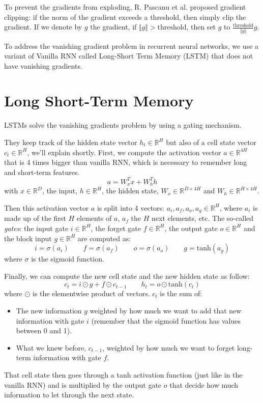 To prevent the gradients from exploding, R. Pascanu et al. \cite{difficulty-rnn} proposed gradient clipping: if the norm of the gradient exceeds a threshold, then simply clip the gradient. If we denote by $g$ the gradient, if $\Vert g \Vert > \text{threshold}$, then set $g$ to $\frac{\text{threshold}}{\Vert g \Vert} g$.

To address the vanishing gradient problem in recurrent neural networks, we use a variant of Vanilla RNN called Long-Short Term Memory (LSTM) \cite{lstm} that does not have vanishing gradients.

\section{Long Short-Term Memory}
LSTMs solve the vanishing gradients problem by using a gating mechanism. 

They keep track of the hidden state vector $h_t \in \mathbb{R}^H$ but also of a cell state vector $c_t\in \mathbb{R}^H$, we'll explain shortly. First, we compute the activation vector $a \in \mathbb{R}^{4H}$ that is 4 times bigger than vanilla RNN, which is necessary to remember long and short-term features. 
\begin{equation}
a = W_x^T x + W_h^T h
\end{equation}
with $x \in \mathbb{R}^{D}$, the input, $h \in \mathbb{R}^{H}$, the hidden state, $W_x \in \mathbb{R}^{D\times 4H}$ and $W_h \in \mathbb{R}^{H\times 4H}$.

Then this activation vector $a$ is split into 4 vectors: $a_i, a_f, a_o, a_g \in \mathbb{R}^H$, where $a_i$ is made up of the first $H$ elements of $a$, $a_f$ the $H$ next elements, etc. The so-called {\em gates}: the input gate $i \in \mathbb{R}^H$, the forget gate $f \in \mathbb{R}^H$, the output gate $o \in \mathbb{R}^H$ and the block input $g \in \mathbb{R}^H$ are computed as: 
\begin{equation}
    i = \sigma(a_i) \qquad f = \sigma(a_f) \qquad o = \sigma(a_o) \qquad g = \text{tanh}(a_g)
\end{equation}
where $\sigma$ is the sigmoid function.

Finally, we can compute the new cell state and the new hidden state as follow:
\begin{equation}
     c_t = i\odot g + f\odot c_{t-1} \qquad h_t = o\odot \text{tanh}(c_t)
\end{equation}
where $\odot$ is the elementwise product of vectors.
$c_t$ is the sum of:
\begin{itemize}
    \item The new information $g$ weighted by how much we want to add that new information with gate $i$ (remember that the sigmoid function has values between 0 and 
    1).
    \item What we knew before, $c_{t-1}$, weighted by how much we want to forget long-term information with gate $f$.
\end{itemize} 
That cell state then goes through a tanh activation function (just like in the vanilla RNN) and is multiplied by the output gate $o$ that decide how much information to let through the next state. 


